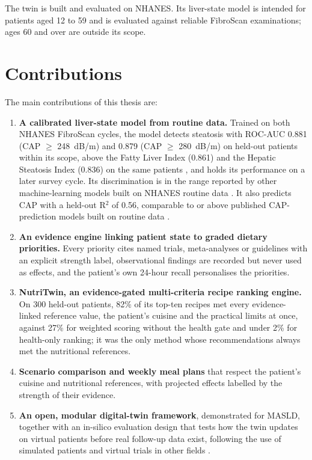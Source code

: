 The twin is built and evaluated on NHANES. Its liver-state model is intended
for patients aged 12 to 59 and is evaluated against reliable FibroScan
examinations; ages 60 and over are outside its scope.

\section{Contributions}
\label{sec:contributions}
The main contributions of this thesis are:
\begin{enumerate}
    \item \textbf{A calibrated liver-state model from routine data.} Trained on
          both NHANES FibroScan cycles, the model detects steatosis with
          ROC-AUC 0.881 (CAP $\geq$ 248~dB/m) and 0.879 (CAP $\geq$ 280~dB/m)
          on held-out patients within its scope, above the Fatty Liver Index
          (0.861) and the Hepatic Steatosis Index (0.836) on the same patients
          \cite{bedogni2006fli,lee2010hsi}, and holds its performance on a
          later survey cycle. Its discrimination is in the range reported by
          other machine-learning models built on NHANES routine data
          \cite{du2026masld,liu2024automl,zhang2025masld,boullion2025biomarker}.
          It also predicts CAP with a held-out R$^2$ of 0.56, comparable to or
          above published CAP-prediction models built on routine data
          \cite{liu2022surrogate}.
    \item \textbf{An evidence engine linking patient state to graded dietary
          priorities.} Every priority cites named trials, meta-analyses or
          guidelines with an explicit strength label, observational findings
          are recorded but never used as effects, and the patient's own
          24-hour recall personalises the priorities.
    \item \textbf{NutriTwin, an evidence-gated multi-criteria recipe ranking
          engine.} On 300 held-out patients, 82\% of its top-ten recipes met
          every evidence-linked reference value, the patient's cuisine and the
          practical limits at once, against 27\% for weighted scoring without
          the health gate and under 2\% for health-only ranking; it was the
          only method whose recommendations always met the nutritional
          references.
    \item \textbf{Scenario comparison and weekly meal plans} that respect the
          patient's cuisine and nutritional references, with projected effects
          labelled by the strength of their evidence.
    \item \textbf{An open, modular digital-twin framework}, demonstrated for
          MASLD, together with an in-silico evaluation design that tests how
          the twin updates on virtual patients before real follow-up data
          exist, following the use of simulated patients and virtual trials in
          other fields \cite{pappalardo2019insilico,kovatchev2009insilico,walonoski2018synthea,franklin2014plasmode}.
\end{enumerate}

